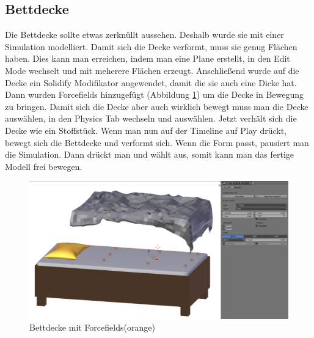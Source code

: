 \subsection{Bettdecke}
\label{bettdecke:ref1}
Die Bettdecke sollte etwas zerknüllt aussehen. Deshalb wurde sie mit einer Simulation modelliert. Damit sich die Decke verformt, muss sie genug Flächen haben.
Dies kann man erreichen, indem man eine Plane erstellt, in den Edit Mode wechselt und mit   meherere Flächen erzeugt. Anschließend wurde auf die Decke ein Solidify Modifikator
angewendet, damit die sie auch eine Dicke hat.
Dann wurden Forcefields hinzugefügt (Abbildung \ref{Bettdecke:image1}) um die Decke in Bewegung zu bringen. Damit sich die Decke aber auch wirklich bewegt muss man die Decke auswählen,
in den Physics Tab wechseln und  auswählen. Jetzt verhält sich die Decke wie ein Stoffstück. Wenn man nun auf der Timeline auf Play drückt, bewegt sich die Bettdecke und verformt sich.
Wenn die Form passt, pausiert man die Simulation. Dann drückt man  und wählt  aus, somit kann man das fertige Modell
frei bewegen.

\begin{figure}[H]
    \centering
    \includegraphics[width=.8\textwidth]{images/Bettdecke_Forcefields.png}
    \caption{Bettdecke mit Forcefields(orange)}
    \label{Bettdecke:image1}
\end{figure}
\flushbottom